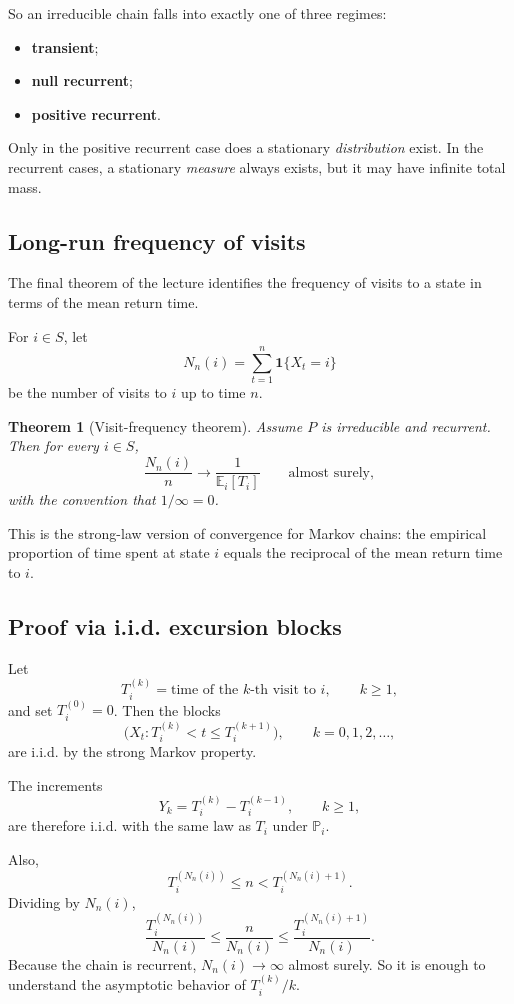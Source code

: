 \documentclass[11pt]{article}
\newtheorem{theorem}{Theorem}[section]
\theoremstyle{definition}
\begin{document}
So an irreducible chain falls into exactly one of three regimes:
\begin{itemize}[leftmargin=2em]
    \item \textbf{transient};
    \item \textbf{null recurrent};
    \item \textbf{positive recurrent}.
\end{itemize}
Only in the positive recurrent case does a stationary \emph{distribution} exist. In the recurrent cases, a stationary \emph{measure} always exists, but it may have infinite total mass.

\subsection{Long-run frequency of visits}

The final theorem of the lecture identifies the frequency of visits to a state in terms of the mean return time.

For \(i\in S\), let
\[
N_n(i)=\sum_{t=1}^{n}\mathbf 1\{X_t=i\}
\]
be the number of visits to \(i\) up to time \(n\).

\begin{theorem}[Visit-frequency theorem]
Assume \(P\) is irreducible and recurrent. Then for every \(i\in S\),
\[
\frac{N_n(i)}{n}
\longrightarrow
\frac{1}{\mathbb E_i[T_i]}
\qquad \text{almost surely},
\]
with the convention that \(1/\infty=0\).
\end{theorem}

This is the strong-law version of convergence for Markov chains: the empirical proportion of time spent at state \(i\) equals the reciprocal of the mean return time to \(i\).

\subsection{Proof via i.i.d. excursion blocks}

Let
\[
T_i^{(k)} = \text{time of the }k\text{-th visit to }i,
\qquad k\ge 1,
\]
and set \(T_i^{(0)}=0\). Then the blocks
\[
\bigl(X_t : T_i^{(k)}<t\le T_i^{(k+1)}\bigr),
\qquad k=0,1,2,\dots,
\]
are i.i.d. by the strong Markov property.

The increments
\[
Y_k=T_i^{(k)}-T_i^{(k-1)},
\qquad k\ge 1,
\]
are therefore i.i.d. with the same law as \(T_i\) under \(\mathbb P_i\).

Also,
\[
T_i^{(N_n(i))}\le n < T_i^{(N_n(i)+1)}.
\]
Dividing by \(N_n(i)\),
\[
\frac{T_i^{(N_n(i))}}{N_n(i)}
\le
\frac{n}{N_n(i)}
\le
\frac{T_i^{(N_n(i)+1)}}{N_n(i)}.
\]
Because the chain is recurrent, \(N_n(i)\to\infty\) almost surely. So it is enough to understand the asymptotic behavior of \(T_i^{(k)}/k\).
\end{document}
